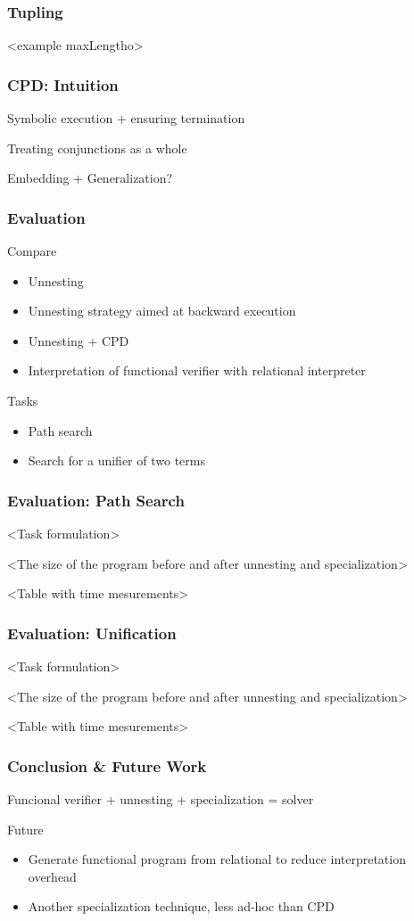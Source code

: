 \documentclass[xcolor=table]{beamer}
\begin{document}
\begin{frame}[fragile]
  \transwipe[direction=90]
  \frametitle{Tupling}
<example maxLengtho>
\end{frame}

\begin{frame}[fragile]
  \transwipe[direction=90]
  \frametitle{CPD: Intuition}
Symbolic execution + ensuring termination

Treating conjunctions as a whole

Embedding + Generalization? 
\end{frame}


\begin{frame}[fragile]
  \transwipe[direction=90]
  \frametitle{Evaluation}
  Compare 
  
\begin{itemize}
  \item Unnesting 
  \item Unnesting strategy aimed at backward execution
  \item Unnesting + CPD
  \item Interpretation of functional verifier with relational interpreter
\end{itemize}

Tasks 

\begin{itemize}
  \item Path search
  \item Search for a unifier of two terms
\end{itemize}
  
\end{frame}

\begin{frame}[fragile]
  \transwipe[direction=90]
  \frametitle{Evaluation: Path Search}

<Task formulation>

<The size of the program before and after unnesting and specialization>

<Table with time mesurements>  
\end{frame}

\begin{frame}[fragile]
  \transwipe[direction=90]
  \frametitle{Evaluation: Unification}

<Task formulation>

<The size of the program before and after unnesting and specialization>

<Table with time mesurements>  
\end{frame}

\begin{frame}[fragile]
  \transwipe[direction=90]
  \frametitle{Conclusion \& Future Work}
Funcional verifier + unnesting + specialization = solver
 
Future
 
\begin{itemize} 
  \item Generate functional program from relational to reduce interpretation overhead
  \item Another specialization technique, less ad-hoc than CPD

\end{itemize} 
\end{frame}
\end{document}
